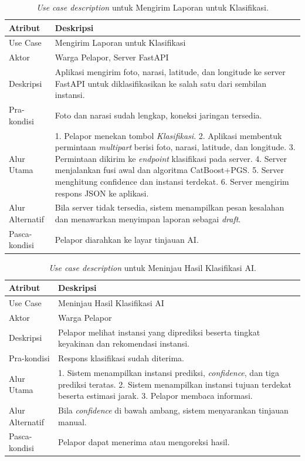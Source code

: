 \begin{table}[htbp]
\centering
\caption{\textit{Use case description} untuk Mengirim Laporan untuk Klasifikasi.}
\label{tab:uc-kirim}
\begin{tabular}{p{3.5cm} p{9cm}}
\toprule
\textbf{Atribut} & \textbf{Deskripsi} \\
\midrule
Use Case & Mengirim Laporan untuk Klasifikasi \\
Aktor & Warga Pelapor, Server FastAPI \\
Deskripsi & Aplikasi mengirim foto, narasi, latitude, dan longitude ke server FastAPI untuk diklasifikasikan ke salah satu dari sembilan instansi. \\
Pra-kondisi & Foto dan narasi sudah lengkap, koneksi jaringan tersedia. \\
Alur Utama & 1. Pelapor menekan tombol \textit{Klasifikasi}. 2. Aplikasi membentuk permintaan \textit{multipart} berisi foto, narasi, latitude, dan longitude. 3. Permintaan dikirim ke \textit{endpoint} klasifikasi pada server. 4. Server menjalankan fusi awal dan algoritma CatBoost+PGS. 5. Server menghitung confidence dan instansi terdekat. 6. Server mengirim respons JSON ke aplikasi. \\
Alur Alternatif & Bila server tidak tersedia, sistem menampilkan pesan kesalahan dan menawarkan menyimpan laporan sebagai \textit{draft}. \\
Pasca-kondisi & Pelapor diarahkan ke layar tinjauan AI. \\
\bottomrule
\end{tabular}
\end{table}

\begin{table}[htbp]
\centering
\caption{\textit{Use case description} untuk Meninjau Hasil Klasifikasi AI.}
\label{tab:uc-tinjau}
\begin{tabular}{p{3.5cm} p{9cm}}
\toprule
\textbf{Atribut} & \textbf{Deskripsi} \\
\midrule
Use Case & Meninjau Hasil Klasifikasi AI \\
Aktor & Warga Pelapor \\
Deskripsi & Pelapor melihat instansi yang diprediksi beserta tingkat keyakinan dan rekomendasi instansi. \\
Pra-kondisi & Respons klasifikasi sudah diterima. \\
Alur Utama & 1. Sistem menampilkan instansi prediksi, \textit{confidence}, dan tiga prediksi teratas. 2. Sistem menampilkan instansi tujuan terdekat beserta estimasi jarak. 3. Pelapor membaca informasi. \\
Alur Alternatif & Bila \textit{confidence} di bawah ambang, sistem menyarankan tinjauan manual. \\
Pasca-kondisi & Pelapor dapat menerima atau mengoreksi hasil. \\
\bottomrule
\end{tabular}
\end{table}

